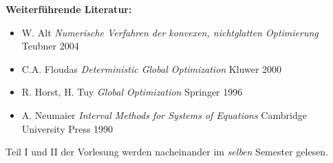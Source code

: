 \begin{course}
\begin{content}
\end{content}



\begin{literature}\textbf{Weiterführende Literatur:}

 \begin{itemize}\item W. Alt \emph{Numerische Verfahren der konvexen, nichtglatten Optimierung }Teubner 2004  \item C.A. Floudas \emph{Deterministic Global Optimization }Kluwer 2000  \item R. Horst, H. Tuy \emph{Global Optimization }Springer 1996  \item A. Neumaier \emph{Interval Methods for Systems of Equations }Cambridge University Press 1990  \end{itemize}\end{literature}

\begin{remarks}Teil I und II der Vorlesung werden nacheinander im \emph{selben }Semester gelesen.

\end{remarks}

\end{course}